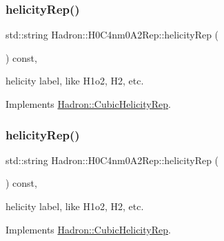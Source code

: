 \mbox{\label{structHadron_1_1H0C4nm0A2Rep_a59dd3bff36461e4696319223e7f03082}} 
\subsubsection{\texorpdfstring{helicityRep()}{helicityRep()}\hspace{0.1cm}{\footnotesize\ttfamily [1/2]}}
{\footnotesize\ttfamily std\+::string Hadron\+::\+H0\+C4nm0\+A2\+Rep\+::helicity\+Rep (\begin{DoxyParamCaption}{ }\end{DoxyParamCaption}) const\hspace{0.3cm}{\ttfamily [inline]}, {\ttfamily [virtual]}}

helicity label, like H1o2, H2, etc. 

Implements \mbox{\hyperlink{structHadron_1_1CubicHelicityRep_af1096946b7470edf0a55451cc662f231}{Hadron\+::\+Cubic\+Helicity\+Rep}}.

\mbox{\label{structHadron_1_1H0C4nm0A2Rep_a59dd3bff36461e4696319223e7f03082}} 
\subsubsection{\texorpdfstring{helicityRep()}{helicityRep()}\hspace{0.1cm}{\footnotesize\ttfamily [2/2]}}
{\footnotesize\ttfamily std\+::string Hadron\+::\+H0\+C4nm0\+A2\+Rep\+::helicity\+Rep (\begin{DoxyParamCaption}{ }\end{DoxyParamCaption}) const\hspace{0.3cm}{\ttfamily [inline]}, {\ttfamily [virtual]}}

helicity label, like H1o2, H2, etc. 

Implements \mbox{\hyperlink{structHadron_1_1CubicHelicityRep_af1096946b7470edf0a55451cc662f231}{Hadron\+::\+Cubic\+Helicity\+Rep}}.

\mbox{\label{structHadron_1_1H0C4nm0A2Rep_a82046f2360bc0682e6b0f7ce6b03286c}} 
